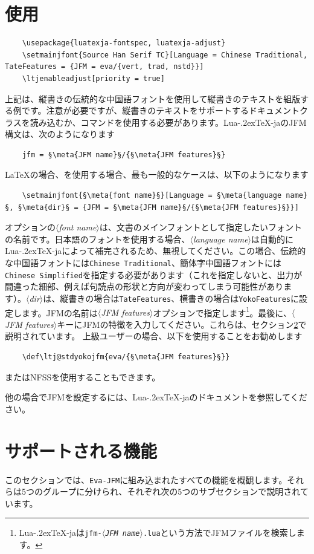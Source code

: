 \documentclass[twoside]{ltjsarticle}
\def\meta#1{{\normalfont\rmfamily\itshape$\langle$#1\/$\rangle$}}
\def\段{\par}
\def\LuaTeX{Lua\kern-.2ex\TeX}
\begin{document}
\section{使用}
\begin{lstlisting}
    \usepackage{luatexja-fontspec, luatexja-adjust}
    \setmainjfont{Source Han Serif TC}[Language = Chinese Traditional, TateFeatures = {JFM = eva/{vert, trad, nstd}}]
    \ltjenableadjust[priority = true]
\end{lstlisting}
\indent 上記は、縦書きの伝統的な中国語フォントを使用して縦書きのテキストを組版する例です。注意が必要ですが、縦書きのテキストをサポートするドキュメントクラスを読み込むか、\texttt{\string\tate}コマンドを使用する必要があります。\LuaTeX-jaのJFM構文は、次のようになります
\begin{lstlisting}
    jfm = §\meta{JFM name}§/{§\meta{JFM features}§}
\end{lstlisting}
{\LaTeX}の場合、\texttt{\string\setmainjfont}を使用する場合、最も一般的なケースは、以下のようになります
\begin{lstlisting}
    \setmainjfont{§\meta{font name}§}[Language = §\meta{language name}§, §\meta{dir}§ = {JFM = §\meta{JFM name}§/{§\meta{JFM features}§}}]
\end{lstlisting}
オプションの\meta{font name}は、文書のメインフォントとして指定したいフォントの名前です。日本語のフォントを使用する場合、\meta{language name}は自動的に\LuaTeX-jaによって補完されるため、無視してください。この場合、伝統的な中国語フォントには\texttt{Chinese Traditional}、簡体字中国語フォントには\texttt{Chinese Simplified}を指定する必要があります（これを指定しないと、出力が間違った細部、例えば句読点の形状と方向が変わってしまう可能性があります）。\meta{dir}は、縦書きの場合は\texttt{TateFeatures}、横書きの場合は\texttt{YokoFeatures}に設定します。JFMの名前は\meta{JFM features}オプションで指定します\footnote{\LuaTeX-jaは\texttt{jfm-\meta{JFM name}.lua}という方法でJFMファイルを検索します。}。最後に、\meta{JFM features}キーにJFMの特徴を入力してください。これらは、セクション\ref{sec:feat}で説明されています。
上級ユーザーの場合、以下を使用することをお勧めします
\begin{lstlisting}
    \def\ltj@stdyokojfm{eva/{§\meta{JFM features}§}}
\end{lstlisting}
またはNFSSを使用することもできます。\段
他の場合でJFMを設定するには、\LuaTeX-jaのドキュメント\cite{luatexja-doc}を参照してください。

\section{サポートされる機能}
\label{sec:feat}
このセクションでは、\texttt{Eva-JFM}に組み込まれたすべての機能を概観します。それらは5つのグループに分けられ、それぞれ次の5つのサブセクションで説明されています。
\end{document}
